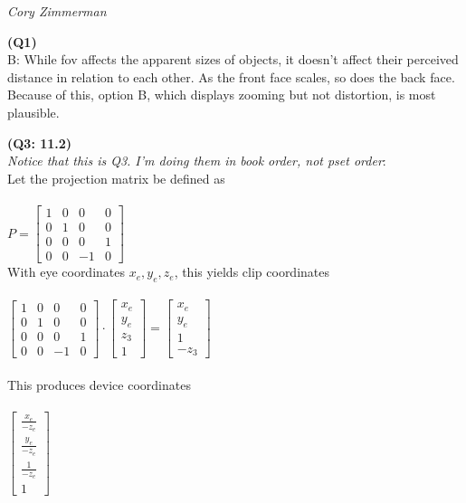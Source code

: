 \documentclass[letterpaper, 11pt]{article}
\begin{document}
\noindent \textit{Cory Zimmerman}
\medskip

\noindent \textbf{(Q1)} \\ 
B: While fov affects the apparent sizes of objects, it doesn't affect their perceived distance in relation to each other. As the front face scales, so does the back face. Because of this, option B, which displays zooming but not distortion, is most plausible.

\medskip
\textbf{(Q3: 11.2)} \\ 
\textit{Notice that this is Q3. I'm doing them in book order, not pset order}: \\
Let the projection matrix be defined as \\ \\ 
$P = \begin{bmatrix}
1 & 0 & 0 & 0 \\
0 & 1 & 0 & 0 \\
0 & 0 & 0 & 1 \\
0 & 0 & -1 & 0
\end{bmatrix}$ \\

With eye coordinates $x_e, y_e, z_e$, this yields clip coordinates \\ \\ 
$\begin{bmatrix}
1 & 0 & 0 & 0 \\
0 & 1 & 0 & 0 \\
0 & 0 & 0 & 1 \\
0 & 0 & -1 & 0
\end{bmatrix} 
\cdot 
\begin{bmatrix}
x_e  \\
y_e  \\
z_3  \\
1 
\end{bmatrix}
=
\begin{bmatrix}
x_e  \\
y_e  \\
1 \\
-z_3
\end{bmatrix}$ \\ \\ 

This produces device coordinates \\ \\ 
$\begin{bmatrix}
\frac{x_e}{-z_e}  \\
\frac{y_e}{-z_e}  \\
\frac{1}{-z_e} \\
1
\end{bmatrix}$ \\ \\ 
\end{document}
